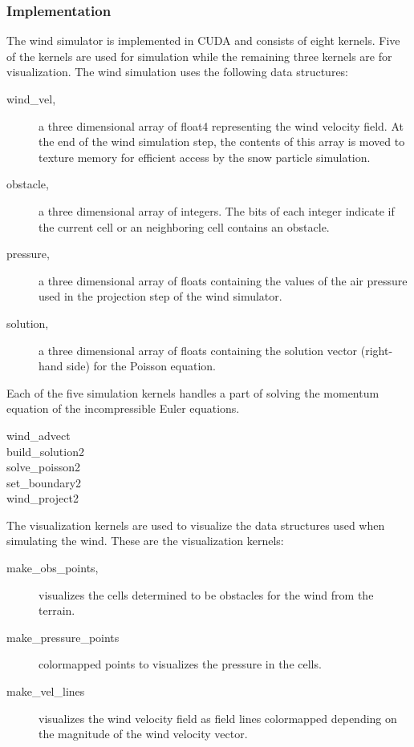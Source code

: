 \subsubsection{Implementation}

The wind simulator is implemented in CUDA and consists of eight kernels. Five of 
the kernels are used for simulation while the remaining three kernels are for 
visualization. The wind simulation uses the following data structures:

\begin{description}
	\item[wind\_vel,] a three dimensional array of float4 representing the wind 
	velocity field. At the end of the wind simulation step, the contents of this 
	array is moved to texture memory for efficient access by the snow particle 
	simulation. 
	\item[obstacle,] a three dimensional array of integers. The bits of each 
	integer indicate if the current cell or an neighboring cell contains an 
	obstacle. 
	\item[pressure,] a three dimensional array of floats containing the values 
	of the air pressure used in the projection step of the wind simulator. 
	\item[solution,] a three dimensional array of floats containing the solution 
	vector (right-hand side) for the Poisson equation. 
\end{description}

Each of the five simulation kernels handles a part of solving the momentum equation 
of the incompressible Euler equations.
\begin{description}
	\item[wind\_advect]
	\item[build\_solution2]
	\item[solve\_poisson2]
	\item[set\_boundary2]
	\item[wind\_project2]
\end{description}

The visualization kernels are used to visualize the data structures used when 
simulating the wind. These are the visualization kernels:

\begin{description}
	\item[make\_obs\_points,] visualizes the cells determined to be obstacles 
	for the wind from the terrain. 
	\item[make\_pressure\_points] colormapped points to visualizes the pressure 
	in the cells. 
	\item[make\_vel\_lines] visualizes the wind velocity field as field lines 
	colormapped depending on the magnitude of the wind velocity vector. 
\end{description}

